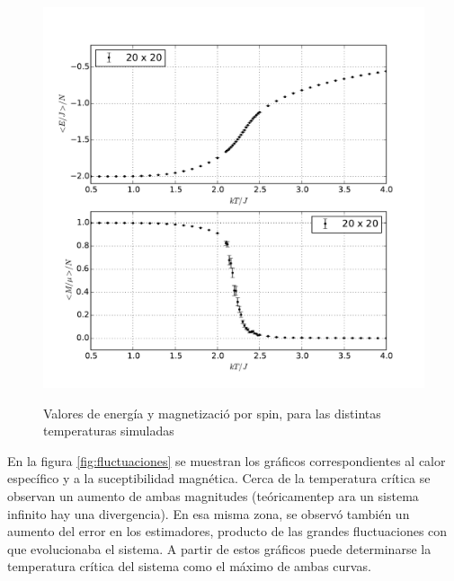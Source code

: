 \documentclass[a4paper,12pt]{article}
\begin{document}
\begin{figure}[H]
    \begin{center}
      \includegraphics[scale=0.7]{val_medios.pdf} \\
      \caption{Valores de energía y magnetizació por spin, para 
      las distintas temperaturas simuladas}\label{fig:val_medios}
    \end{center}
\end{figure}

En la figura \eqref{fig:fluctuaciones} se muestran los gráficos 
correspondientes al calor específico y a la suceptibilidad magnética. Cerca de 
la temperatura crítica se observan un aumento de ambas magnitudes 
(teóricamentep ara un sistema infinito hay una divergencia). En esa misma zona, 
se observó también un aumento del error en los estimadores, producto de las 
grandes fluctuaciones con que evolucionaba el sistema. A partir de estos 
gráficos puede determinarse la temperatura crítica del sistema como el máximo 
de ambas curvas.
\end{document}
